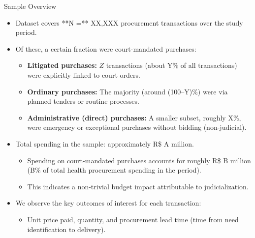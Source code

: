 \documentclass{beamer}
\begin{document}
\begin{frame}{Sample Overview}
\begin{itemize}
  \item Dataset covers **N =** XX,XXX procurement transactions over the study period.
  \item Of these, a certain fraction were court-mandated purchases:
    \begin{itemize}
      \item \textbf{Litigated purchases:} $Z$ transactions (about Y\% of all transactions) were explicitly linked to court orders.
      \item \textbf{Ordinary purchases:} The majority (around (100--Y)\%) were via planned tenders or routine processes.
      \item \textbf{Administrative (direct) purchases:} A smaller subset, roughly X\%, were emergency or exceptional purchases without bidding (non-judicial).
    \end{itemize}
  \item Total spending in the sample: approximately R\$ A million.
    \begin{itemize}
      \item Spending on court-mandated purchases accounts for roughly R\$ B million (B\% of total health procurement spending in the period).
      \item This indicates a non-trivial budget impact attributable to judicialization.
    \end{itemize}
  \item We observe the key outcomes of interest for each transaction:
    \begin{itemize}
      \item Unit price paid, quantity, and procurement lead time (time from need identification to delivery).
    \end{itemize}
\end{itemize}
\end{frame}
\end{document}
